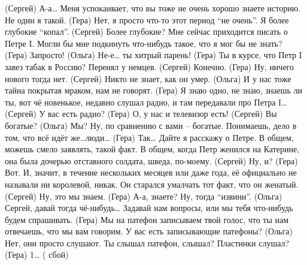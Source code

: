  (Сергей) А-а… Меня успокаивает, что вы тоже не очень хорошо знаете историю. Не один я такой.
 (Гера)   Нет, я просто что-то этот период ``не очень''. Я более глубокие ``копал''.
 (Сергей) Более глубокие? Мне сейчас приходится писать о Петре I. Могли бы мне подкинуть что-нибудь такое, что я мог бы не знать?
 (Гера)   Запросто!
 (Ольга)  Не-е… ты хитрый парень! 
 (Гера)   Ты в курсе, что Петр I завез табак  в Россию?  Перенял у немцев.
 (Сергей) Конечно.
 (Гера)   Ну, ничего нового тогда нет. 
 (Сергей) Никто не знает, как он умер. 
 (Ольга)  И у нас тоже тайна покрытая мраком, нам не говорят. 
 (Гера)   Я знаю одно, не знаю, знаешь ли ты, вот чё новенькое, недавно слушал радио,  и там передавали про Петра I…
 (Сергей) У вас есть радио?
 (Гера)   О, у нас и телевизор есть!
 (Сергей) Вы богатые?
 (Ольга)  Мы? Ну, по сравнению с вами – богатые. Понимаешь, дело в том, что всё идёт же…люди…
 (Гера)   Так… Дайте я расскажу о Петре. В общем, можешь смело заявлять, такой факт. В общем, когда Петр женился на Катерине, она была дочерью отставного солдата, шведа, по-моему.
 (Сергей) Ну, и?
 (Гера)   Вот. И, значит, в течение нескольких месяцев или даже года, её официально не называли ни королевой, никак.  Он старался умалчать тот факт, что он женатый.
 (Сергей) Ну, это мы знаем.
 (Гера)   А-а, знаете? Ну, тогда ``извини''.
 (Ольга)  Сергей, давай тогда чё-нибудь… Задавай нам вопросы, или мы тебя что-нибудь будем спрашивать.
 (Гера)   Мы на патефон записываем твой голос, что ты нам отвечаешь, что мы вам говорим.  У вас есть записывающие патефоны?
 (Ольга) Нет, они просто слушают. Ты слышал патефон, слышал? Пластинки слушал?
 (Гера) 1…
 ( сбой)
